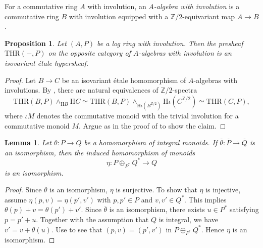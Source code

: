 \documentclass[10pt]{amsart}
\newtheorem{prop}[thm]{Proposition}
\newtheorem{lem}[thm]{Lemma}
\theoremstyle{definition}
\theoremstyle{remark}
\numberwithin{equation}{section}
\newcommand{\Z}{\mathbb{Z}}
\newcommand{\ol}{\overline}
\newcommand{\EM}{\mathrm{H}}
\newcommand{\THR}{\mathrm{THR}}
\newcommand{\Ztwo}{{\mathbb{Z}/2}}
\begin{document}
For a commutative ring $A$ with involution, an \emph{$A$-algebra with involution} is a commutative ring $B$ with involution equipped with a $\Z/2$-equivariant map $A\to B$.

\begin{prop}
\label{descent.7}
Let $(A,P)$ be a log ring with involution.
Then the presheaf $\THR(-,P)$ on the opposite category of $A$-algebras with involution is an isovariant \'etale hypersheaf.
\end{prop}
\begin{proof}
Let $B\to C$ be an isovariant \'etale homomorphism of $A$-algebras with involutions.
By \cite[Theorem 3.2.3]{THR},
there are natural equivalences of $\Ztwo$-spectra
\[
\THR(B,P)
\wedge_{\EM B}
\EM C
\simeq
\THR(B,P)
\wedge_{\EM \iota (B^{\Ztwo})}
\EM \iota (C^{\Ztwo})
\simeq
\THR(C,P),
\]
where $\iota M$ denotes the commutative monoid with the trivial involution for a commutative monoid $M$.
Argue as in the proof of \cite[Theorem 3.4.3]{THR} to show the claim.
\end{proof}



\begin{lem}
\label{strict.2}
Let $\theta\colon P\to Q$ be a homomorphism of integral monoids.
If $\ol{\theta}\colon \ol{P}\to \ol{Q}$ is an isomorphism, then the induced homomorphism of monoids
\begin{equation}
\label{strict.2.1}
\eta
\colon
P\oplus_{P^*}Q^*
\to
Q
\end{equation}
is an isomorphism.
\end{lem}
\begin{proof}
Since $\ol{\theta}$ is an isomorphism,
$\eta$ is surjective.
To show that $\eta$ is injective,
assume $\eta(p,v)=\eta(p',v')$ with $p,p'\in P$ and $v,v'\in Q^*$.
This implies $\theta(p)+v=\theta(p')+v'$.
Since $\ol{\theta}$ is an isomorphism,
there exists $u\in P^*$ satisfying $p=p'+u$.
Together with the assumption that $Q$ is integral,
we have $v'=v+\theta(u)$.
Use \cite[Proposition I.1.1.5(3)]{Ogu} to see that $(p,v)=(p',v')$ in $P\oplus_{P^*} Q^*$.
Hence $\eta$ is an isomorphism.
\end{proof}
\end{document}
